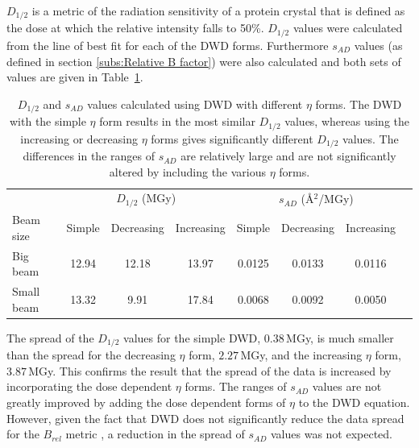$D_{1/2}$ is a metric of the radiation sensitivity of a protein crystal that is defined as the dose at which the relative intensity falls to 50\%.
$D_{1/2}$ values were calculated from the line of best fit for each of the DWD forms.
Furthermore $s_{AD}$ values (as defined in section \ref{subs:Relative B factor}) were also calculated and both sets of values are given in Table~\ref{tab:Half dose and SAD values}.
\begin{table}[ht!]
\small
\captionsetup{justification=centering}
	\caption[Comparison of $D_{1/2}$ and $s_{AD}$ values using DWD with different $\eta$ forms]{$D_{1/2}$ and $s_{AD}$ values calculated using DWD with different $\eta$ forms.
    The DWD with the simple $\eta$ form results in the most similar $D_{1/2}$ values, whereas using the increasing or decreasing $\eta$ forms gives significantly different $D_{1/2}$ values.
    The differences in the ranges of $s_{AD}$ are relatively large and are not significantly altered by including the various $\eta$ forms.}
	\centering
	\begin{tabular}{p{2cm}*{6}{c}r}
		& \multicolumn{3}{c}{$D_{1/2}$ (MGy)} & \multicolumn{3}{c}{$s_{AD}$ (\AA$^2$/MGy)} \\
		\cmidrule(l{2pt}r{2pt}){2-4} \cmidrule(l{2pt}r{2pt}){5-7}
		Beam size			&Simple	    &Decreasing   &Increasing     &Simple	    &Decreasing   &Increasing	\\
		\hline
		Big beam    		&12.94	    &12.18 	      &13.97         &0.0125	    &0.0133	      &0.0116	\\
		Small beam     		&13.32		&9.91 	      &17.84         &0.0068	    &0.0092       &0.0050     \\
		\hline
	\end{tabular}
	\label{tab:Half dose and SAD values}
\end{table}
The spread of the $D_{1/2}$ values for the simple DWD, $0.38\,$MGy, is much smaller than the spread for the decreasing $\eta$ form, $2.27\,$MGy, and the increasing $\eta$ form, $3.87\,$MGy.
This confirms the result that the spread of the data is increased by incorporating the dose dependent $\eta$ forms.
The ranges of $s_{AD}$ values are not greatly improved by adding the dose dependent forms of $\eta$ to the DWD equation.
However, given the fact that DWD does not significantly reduce the data spread for the $B_{rel}$ metric \cite{zeldin2013dwd}, a reduction in the spread of $s_{AD}$ values was not expected.

